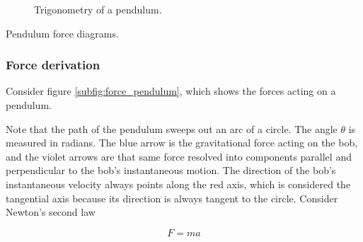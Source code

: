 \begin{bookfigure}
\begin{subfigure}{0.5\textwidth}
    \caption{Trigonometry of a pendulum.}
    \label{subfig:trig_pendulum}
  \end{subfigure}
  \caption{Pendulum force diagrams.}
\end{bookfigure}

\subsubsection{Force derivation}

Consider figure \ref{subfig:force_pendulum}, which shows the forces acting on a
pendulum.

Note that the path of the pendulum sweeps out an arc of a circle. The angle
$\theta$ is measured in radians. The blue arrow is the gravitational force
acting on the bob, and the violet arrows are that same force resolved into
components parallel and perpendicular to the bob's instantaneous motion. The
direction of the bob's instantaneous velocity always points along the red axis,
which is considered the tangential axis because its direction is always tangent
to the circle. Consider Newton's second law

\begin{equation*}
  F = ma
\end{equation*}

